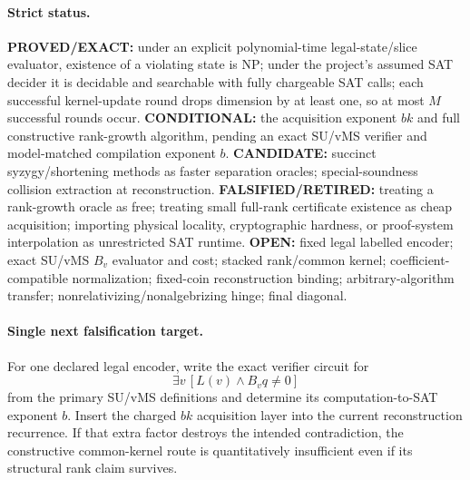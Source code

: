 \documentclass[11pt]{article}
\begin{document}
\paragraph{Strict status.} \textbf{PROVED/EXACT:} under an explicit polynomial-time legal-state/slice evaluator, existence of a violating state is NP; under the project's assumed SAT decider it is decidable and searchable with fully chargeable SAT calls; each successful kernel-update round drops dimension by at least one, so at most $M$ successful rounds occur. \textbf{CONDITIONAL:} the acquisition exponent $bk$ and full constructive rank-growth algorithm, pending an exact SU/vMS verifier and model-matched compilation exponent $b$. \textbf{CANDIDATE:} succinct syzygy/shortening methods as faster separation oracles; special-soundness collision extraction at reconstruction. \textbf{FALSIFIED/RETIRED:} treating a rank-growth oracle as free; treating small full-rank certificate existence as cheap acquisition; importing physical locality, cryptographic hardness, or proof-system interpolation as unrestricted SAT runtime. \textbf{OPEN:} fixed legal labelled encoder; exact SU/vMS $B_v$ evaluator and cost; stacked rank/common kernel; coefficient-compatible normalization; fixed-coin reconstruction binding; arbitrary-algorithm transfer; nonrelativizing/nonalgebrizing hinge; final diagonal.

\paragraph{Single next falsification target.} For one declared legal encoder, write the exact verifier circuit for
\[\exists v\,[L(v)\wedge B_vq\neq0]\]
from the primary SU/vMS definitions and determine its computation-to-SAT exponent $b$. Insert the charged $bk$ acquisition layer into the current reconstruction recurrence. If that extra factor destroys the intended contradiction, the constructive common-kernel route is quantitatively insufficient even if its structural rank claim survives.
\end{document}
